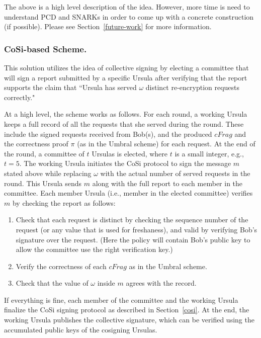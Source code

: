 The above is a high level description of the idea. However, more time is need to 
understand PCD and SNARKs in order to come up with a concrete construction 
(if possible). Please see Section~\ref{future-work} for more information.


\subsubsection{CoSi-based Scheme.}
This solution utilizes the idea of collective signing by electing a committee 
that will sign a report submitted by a specific Ursula after verifying that 
the report supports the claim that ``Ursula has served $\omega$ distinct 
re-encryption requests correctly." 


At a high level, the scheme works as follows. For each round, a working Ursula keeps 
a full record of all the requests that she served during the round. These 
include the signed requests received from Bob(s), and the produced $cFrag$ 
and the correctness proof $\pi$ (as in the Umbral scheme) for 
each request. At the end of the round, a committee of $t$ Ursulas is 
elected, where $t$ is a small integer, e.g., $t = 5$. The working Ursula 
initiates the CoSi protocol to sign the message $m$ stated above while 
replacing $\omega$ with the actual number of served 
requests in the round. This Ursula sends $m$ along with the full report to 
each member in the committee. Each member Ursula (i.e., member in the 
elected committee) verifies $m$ by checking the report as follows:
\begin{enumerate}
\setlength{\itemsep}{0pt}
\item Check that each request is distinct by checking the sequence 
number of the request (or any value that is used for freshaness), and valid by verifying Bob's 
signature over the request. (Here the policy will contain Bob's public 
key to allow the committee use the right verification key.)


\item Verify the correctness of each $cFrag$ as in the Umbral 
scheme.

\item Check that the value of $\omega$ inside $m$ agrees with the 
record.
\end{enumerate}


If everything is fine, each member of the committee and the working 
Ursula finalize the CoSi signing protocol as described in Section~\ref{cosi}. 
At the end, the working Ursula publishes the collective signature, which can be 
verified using the accumulated public keys of the cosigning Ursulas.


